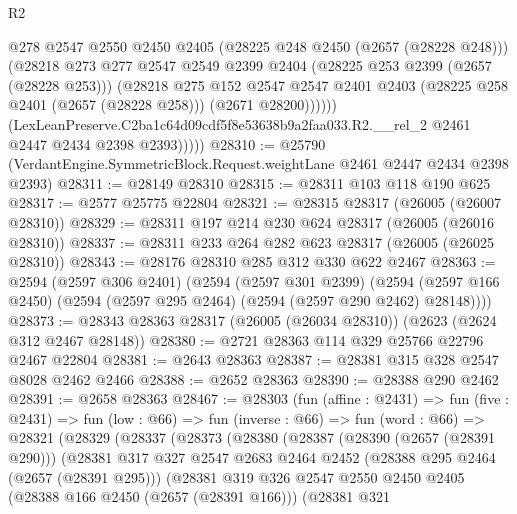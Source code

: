 \begin{lexlean}{R2}
\begin{coremodule}
                  @278
                  @2547
                  @2550
                  @2450
                  @2405
                  (@28225 @248 @2450 (@2657 (@28228 @248)))
                  (@28218
                    @273
                    @277
                    @2547
                    @2549
                    @2399
                    @2404
                    (@28225 @253 @2399 (@2657 (@28228 @253)))
                    (@28218
                      @275
                      @152
                      @2547
                      @2547
                      @2401
                      @2403
                      (@28225 @258 @2401 (@2657 (@28228 @258)))
                      (@2671 @28200))))))
            (LexLeanPreserve.C2ba1c64d09cdf5f8e53638b9a2faa033.R2.__rel_2
              @2461
              @2447
              @2434
              @2398
              @2393)))))
@28310 := @25790 (VerdantEngine.SymmetricBlock.Request.weightLane @2461 @2447 @2434 @2398 @2393)
@28311 := @28149 @28310
@28315 := @28311 @103 @118 @190 @625
@28317 := @2577 @25775 @22804
@28321 := @28315 @28317 (@26005 (@26007 @28310))
@28329 := @28311 @197 @214 @230 @624 @28317 (@26005 (@26016 @28310))
@28337 := @28311 @233 @264 @282 @623 @28317 (@26005 (@26025 @28310))
@28343 := @28176 @28310 @285 @312 @330 @622 @2467
@28363 := @2594
    (@2597 @306 @2401)
    (@2594
      (@2597 @301 @2399)
      (@2594 (@2597 @166 @2450) (@2594 (@2597 @295 @2464) (@2594 (@2597 @290 @2462) @28148))))
@28373 := @28343 @28363 @28317 (@26005 (@26034 @28310)) (@2623 (@2624 @312 @2467 @28148))
@28380 := @2721 @28363 @114 @329 @25766 @22796 @2467 @22804
@28381 := @2643 @28363
@28387 := @28381 @315 @328 @2547 @8028 @2462 @2466
@28388 := @2652 @28363
@28390 := @28388 @290 @2462
@28391 := @2658 @28363
@28467 := @28303
    (fun (affine : @2431) =>
    fun (five : @2431) =>
    fun (low : @66) =>
    fun (inverse : @66) =>
    fun (word : @66) =>
    @28321
      (@28329
        (@28337
          (@28373
            (@28380
              (@28387
                (@28390 (@2657 (@28391 @290)))
                (@28381
                  @317
                  @327
                  @2547
                  @2683
                  @2464
                  @2452
                  (@28388 @295 @2464 (@2657 (@28391 @295)))
                  (@28381
                    @319
                    @326
                    @2547
                    @2550
                    @2450
                    @2405
                    (@28388 @166 @2450 (@2657 (@28391 @166)))
                    (@28381
                      @321

\end{coremodule}
\end{lexlean}
